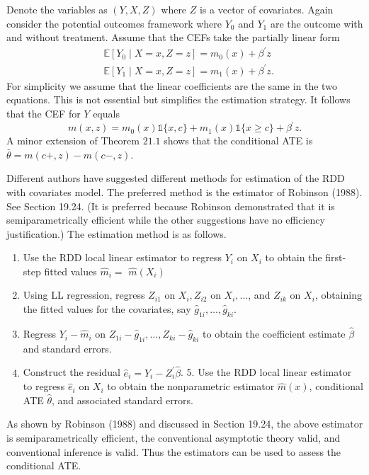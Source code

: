 \documentclass[10pt]{article}
\begin{document}
Denote the variables as $(Y, X, Z)$ where $Z$ is a vector of covariates. Again consider the potential outcomes framework where $Y_{0}$ and $Y_{1}$ are the outcome with and without treatment. Assume that the CEFs take the partially linear form
$$
\begin{aligned}
&\mathbb{E}\left[Y_{0} \mid X=x, Z=z\right]=m_{0}(x)+\beta^{\prime} z \\
&\mathbb{E}\left[Y_{1} \mid X=x, Z=z\right]=m_{1}(x)+\beta^{\prime} z .
\end{aligned}
$$
For simplicity we assume that the linear coefficients are the same in the two equations. This is not essential but simplifies the estimation strategy. It follows that the CEF for $Y$ equals
$$
m(x, z)=m_{0}(x) \mathbb{1}\{x, c\}+m_{1}(x) \mathbb{1}\{x \geq c\}+\beta^{\prime} z .
$$
A minor extension of Theorem $21.1$ shows that the conditional ATE is $\bar{\theta}=m(c+, z)-m(c-, z)$.

Different authors have suggested different methods for estimation of the RDD with covariates model. The preferred method is the estimator of Robinson (1988). See Section 19.24. (It is preferred because Robinson demonstrated that it is semiparametrically efficient while the other suggestions have no efficiency justification.) The estimation method is as follows.

\begin{enumerate}
  \item Use the RDD local linear estimator to regress $Y_{i}$ on $X_{i}$ to obtain the first-step fitted values $\widehat{m}_{i}=$ $\widehat{m}\left(X_{i}\right)$

  \item Using LL regression, regress $Z_{i 1}$ on $X_{i}, Z_{i 2}$ on $X_{i}, \ldots$, and $Z_{i k}$ on $X_{i}$, obtaining the fitted values for the covariates, say $\widehat{g}_{1 i}, \ldots, \widehat{g}_{k i}$.

  \item Regress $Y_{i}-\widehat{m}_{i}$ on $Z_{1 i}-\widehat{g}_{1 i}, \ldots, Z_{k i}-\widehat{g}_{k i}$ to obtain the coefficient estimate $\widehat{\beta}$ and standard errors.

  \item Construct the residual $\widehat{e}_{i}=Y_{i}-Z_{i}^{\prime} \widehat{\beta}$. 5. Use the RDD local linear estimator to regress $\widehat{e}_{i}$ on $X_{i}$ to obtain the nonparametric estimator $\widehat{m}(x)$, conditional ATE $\widehat{\theta}$, and associated standard errors.

\end{enumerate}
As shown by Robinson (1988) and discussed in Section 19.24, the above estimator is semiparametrically efficient, the conventional asymptotic theory valid, and conventional inference is valid. Thus the estimators can be used to assess the conditional ATE.
\end{document}
